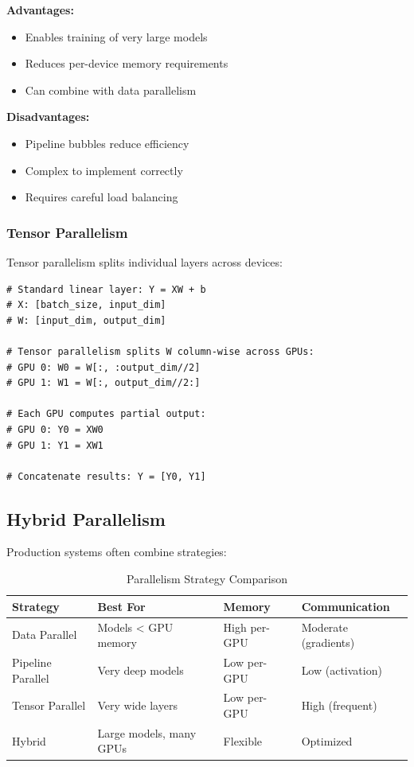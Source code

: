 \textbf{Advantages:}
\begin{itemize}
    \item Enables training of very large models
    \item Reduces per-device memory requirements
    \item Can combine with data parallelism
\end{itemize}

\textbf{Disadvantages:}
\begin{itemize}
    \item Pipeline bubbles reduce efficiency
    \item Complex to implement correctly
    \item Requires careful load balancing
\end{itemize}

\subsubsection{Tensor Parallelism}

Tensor parallelism splits individual layers across devices:

\begin{lstlisting}[style=python, caption=Tensor Parallelism Conceptual Example]
# Standard linear layer: Y = XW + b
# X: [batch_size, input_dim]
# W: [input_dim, output_dim]

# Tensor parallelism splits W column-wise across GPUs:
# GPU 0: W0 = W[:, :output_dim//2]
# GPU 1: W1 = W[:, output_dim//2:]

# Each GPU computes partial output:
# GPU 0: Y0 = XW0
# GPU 1: Y1 = XW1

# Concatenate results: Y = [Y0, Y1]
\end{lstlisting}

\subsection{Hybrid Parallelism}

Production systems often combine strategies:

\begin{table}[h]
\centering
\caption{Parallelism Strategy Comparison}
\label{tab:parallelism_comparison}
\small
\begin{tabular}{@{}lp{3cm}p{3cm}p{3.5cm}@{}}
\toprule
\textbf{Strategy} & \textbf{Best For} & \textbf{Memory} & \textbf{Communication} \\
\midrule
Data Parallel & Models < GPU memory & High per-GPU & Moderate (gradients) \\
Pipeline Parallel & Very deep models & Low per-GPU & Low (activation) \\
Tensor Parallel & Very wide layers & Low per-GPU & High (frequent) \\
Hybrid & Large models, many GPUs & Flexible & Optimized \\
\bottomrule
\end{tabular}
\end{table}

